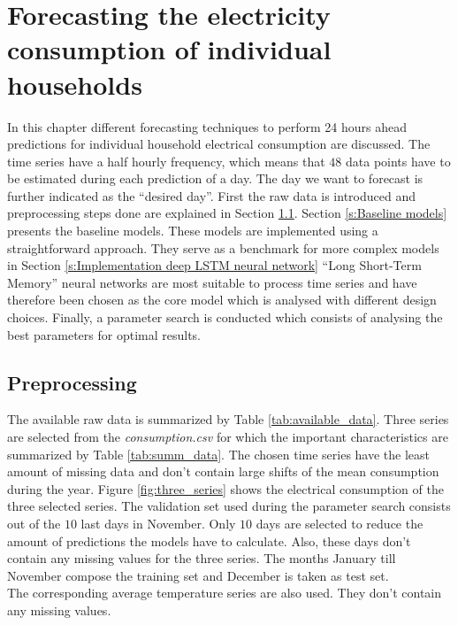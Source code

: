 \chapter{Forecasting the electricity consumption of individual households}
\label{cha:Forecasting the daily electricity consumption}
In this chapter different forecasting techniques to perform 24 hours ahead predictions for individual household electrical consumption are discussed. The time series have a half hourly frequency, which means that $ 48 $ data points have to be estimated during each prediction of a day. The day we want to forecast is further indicated as the ``desired day''. First the raw data is introduced and preprocessing steps done are explained in Section \ref{s:Preprocessing_cha4}. Section \ref{s:Baseline models} presents the baseline models. These models are implemented using a straightforward approach. They serve as a benchmark for more complex models in Section \ref{s:Implementation deep LSTM neural network} ``Long Short-Term Memory'' neural networks are most suitable to process time series and have therefore been chosen as the core model which is analysed with different design choices. Finally, a parameter search is conducted which consists of analysing the best parameters for optimal results.
 
\section{Preprocessing}\label{s:Preprocessing_cha4}
The available raw data is summarized by Table \ref{tab:available_data}. 
Three series are selected from the \textit{consumption.csv} for which the important characteristics are summarized by Table \ref{tab:summ_data}. The chosen time series have the least amount of missing data and don't contain large shifts of the mean consumption during the year. Figure \ref{fig:three_series} shows the electrical consumption of the three selected series. The validation set used during the parameter search consists out of the $ 10 $ last days in November. Only $ 10 $ days are selected to reduce the amount of predictions the models have to calculate. Also, these days don't contain any missing values for the three series. The months January till  November compose the training set and December is taken as test set.\\ 
The corresponding average temperature series are also used. They don't contain any missing values.

